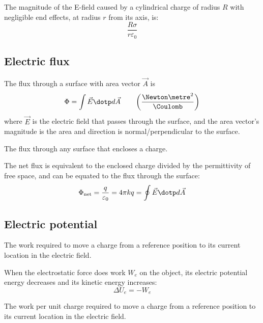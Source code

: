 \begin{example}
  The magnitude of the E-field caused by a cylindrical charge of radius $R$ with negligible end effects, at radius $r$ from its axis, is:
  \[
    \frac{R\sigma}{r\varepsilon_0}
  \]
\end{example}

\subsection{Electric flux}

\begin{definition}
  The flux through a surface with area vector $\vec{A}$ is
  \[
    \Phi = \int \vec{E} \dotp d\vec{A} \qquad \left(\frac{\Newton \metre^2}{\Coulomb}\right)
  \]
  where $\vec{E}$ is the electric field that passes through the surface, and the area vector's magnitude is the area and direction is normal/perpendicular to the surface.
\end{definition}

\begin{definition}
  The flux through any surface that encloses a charge.
\end{definition}

\begin{namedtheorem}
  The net flux is equivalent to the enclosed charge divided by the permittivity of free space, and can be equated to the flux through the surface:
  \[
    \Phi_{\text{net}} = \frac{q}{\varepsilon_0} = 4\pi k q = \oint \vec{E} \dotp d\vec{A}
  \]
\end{namedtheorem}

\subsection{Electric potential}

\begin{definition}
  The work required to move a charge from a reference position to its current location in the electric field.

  When the electrostatic force does work $W_e$ on the object, its electric potential energy decreases and its kinetic energy increases:
  \[
    \Delta U_e = -W_e
  \]
\end{definition}

\begin{definition}
  The work per unit charge required to move a charge from a reference position to its current location in the electric field.
\end{definition}

